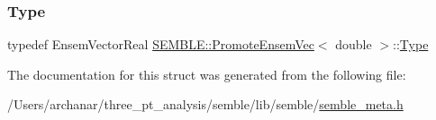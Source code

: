 \subsubsection{\texorpdfstring{Type}{Type}\hspace{0.1cm}{\footnotesize\ttfamily [2/2]}}
{\footnotesize\ttfamily typedef Ensem\+Vector\+Real \mbox{\hyperlink{structSEMBLE_1_1PromoteEnsemVec}{S\+E\+M\+B\+L\+E\+::\+Promote\+Ensem\+Vec}}$<$ double $>$\+::\mbox{\hyperlink{structSEMBLE_1_1PromoteEnsemVec_3_01double_01_4_a5dc432f418f98544267b5392b92ce102}{Type}}}



The documentation for this struct was generated from the following file\+:\begin{DoxyCompactItemize}
\item 
/\+Users/archanar/three\+\_\+pt\+\_\+analysis/semble/lib/semble/\mbox{\hyperlink{lib_2semble_2semble__meta_8h}{semble\+\_\+meta.\+h}}\end{DoxyCompactItemize}
